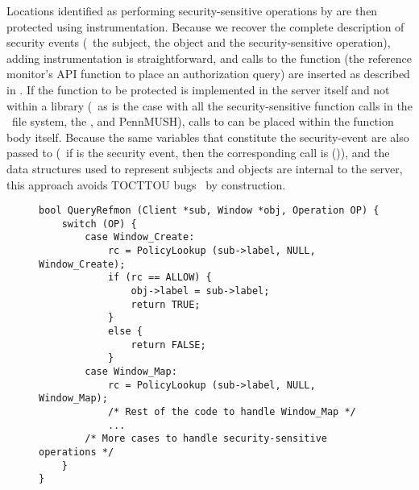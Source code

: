 Locations identified as performing security-sensitive operations by
 are then protected using instrumentation.
Because we recover the complete description of security events (\ie~the
subject, the object and the security-sensitive operation), adding
instrumentation is straightforward, and calls to the 
function (the reference monitor's API function to place an authorization 
query) are inserted as described in
. If the function to be protected is
implemented in the server itself and not within a library (\eg~as is the case
with all the security-sensitive function calls in the \ext\ file system, the
\xserver, and PennMUSH), calls to  can be placed within the
function body itself. Because the same variables that constitute the
security-event are also passed to  (\ie\ if
 is the security event, then
the corresponding call is
()), and the
data structures used to represent subjects and objects are internal to the
server, this approach avoids TOCTTOU bugs~\cite{bd96} by construction.

\begin{figure}[ht!]
\begin{center}
\newsavebox{\queryrefmon}
\begin{lrbox}{\queryrefmon}
\begin{minipage}[ht]{6in}
\begin{lstlisting}
bool QueryRefmon (Client *sub, Window *obj, Operation OP) {
    switch (OP) {
        case Window_Create:
            rc = PolicyLookup (sub->label, NULL, Window_Create);
            if (rc == ALLOW) {
                obj->label = sub->label;
                return TRUE;
            }
            else {
                return FALSE;
            }
        case Window_Map:
            rc = PolicyLookup (sub->label, NULL, Window_Map);
            /* Rest of the code to handle Window_Map */
            ...
        /* More cases to handle security-sensitive operations */
    }
}
\end{lstlisting}
\end{minipage}
\end{lrbox}\fbox{\usebox{\queryrefmon}}
\end{center}
{\label{figure:queryrefmon}}
\end{figure}

